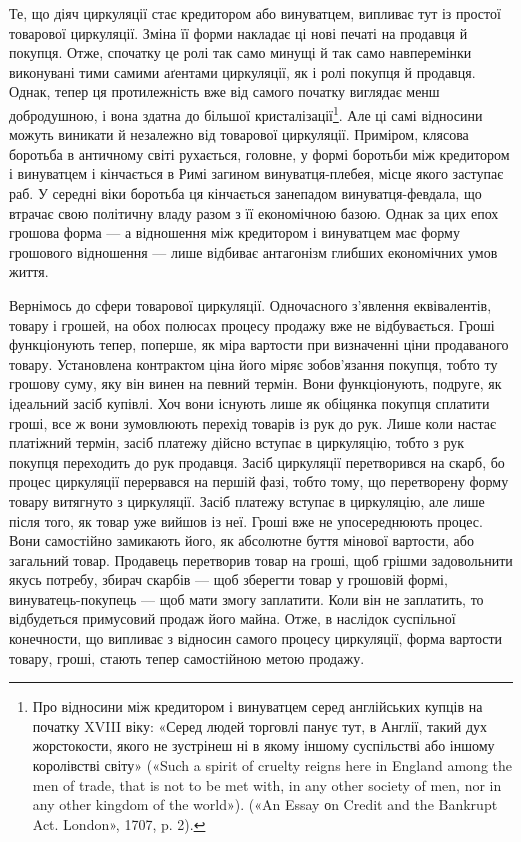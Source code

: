 Те, що діяч циркуляції стає кредитором або винуватцем, випливає
тут із простої товарової циркуляції. Зміна її форми накладає ці
нові печаті на продавця й покупця. Отже, спочатку це ролі так
само минущі й так само навперемінки виконувані тими самими аґентами
циркуляції, як і ролі покупця й продавця. Однак, тепер ця
протилежність вже від самого початку виглядає менш добродушною,
і вона здатна до більшої кристалізації\footnote{
Про відносини між кредитором і винуватцем серед англійських
купців на початку XVIII віку: «Серед людей торговлі панує тут, в Англії,
такий дух жорстокости, якого не зустрінеш ні в якому іншому суспільстві
або іншому королівстві світу» («Such a spirit of cruelty reigns here
in England among the men of trade, that is not to be met with, in any other
society of men, nor in any other kingdom of the world»). («An Essay оn Credit and the Bankrupt Act.
London», 1707, p. 2).
}. Але ці самі відносини
можуть виникати й незалежно від товарової циркуляції.
Приміром, клясова боротьба в античному світі рухається, головне,
у формі боротьби між кредитором і винуватцем і кінчається в
Римі загином винуватця-плебея, місце якого заступає раб. У середні
віки боротьба ця кінчається занепадом винуватця-февдала,
що втрачає свою політичну владу разом з її економічною
базою. Однак за цих епох грошова форма — а відношення між
кредитором і винуватцем має форму грошового відношення — лише
відбиває антагонізм глибших економічних умов життя.

Вернімось до сфери товарової циркуляції. Одночасного з’явлення
еквівалентів, товару і грошей, на обох полюсах процесу
продажу вже не відбувається. Гроші функціонують тепер, поперше,
як міра вартости при визначенні ціни продаваного товару.
Установлена контрактом ціна його міряє зобов’язання покупця,
тобто ту грошову суму, яку він винен на певний термін. Вони
функціонують, подруге, як ідеальний засіб купівлі. Хоч вони
існують лише як обіцянка покупця сплатити гроші, все ж вони
зумовлюють перехід товарів із рук до рук. Лише коли настає
платіжний термін, засіб платежу дійсно вступає в циркуляцію,
тобто з рук покупця переходить до рук продавця. Засіб циркуляції
перетворився на скарб, бо процес циркуляції перервався
на першій фазі, тобто тому, що перетворену форму товару витягнуто
з циркуляції. Засіб платежу вступає в циркуляцію, але
лише після того, як товар уже вийшов із неї. Гроші вже не упосереднюють
процес. Вони самостійно замикають його, як абсолютне
буття мінової вартости, або загальний товар. Продавець
перетворив товар на гроші, щоб грішми задовольнити якусь
потребу, збирач скарбів — щоб зберегти товар у грошовій
формі, винуватець-покупець — щоб мати змогу заплатити. Коли
він не заплатить, то відбудеться примусовий продаж його майна.
Отже, в наслідок суспільної конечности, що випливає з відносин
самого процесу циркуляції, форма вартости товару, гроші, стають
тепер самостійною метою продажу.

